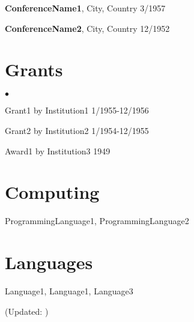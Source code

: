 \documentclass[margin, centered]{res} %
\newenvironment{list2}{
  \begin{list}{$\bullet$}{%
      \setlength{\itemsep}{0in}
      \setlength{\parsep}{0in} \setlength{\parskip}{0in}
      \setlength{\topsep}{0in} \setlength{\partopsep}{0in} 
      \setlength{\leftmargin}{0.2in}}}{\end{list}}
\begin{document}
\begin{resume}
{\bf ConferenceName1}, City, Country \hfill {3/1957}

{\bf ConferenceName2}, City, Country \hfill {12/1952}

\section{\sc Grants} 
\begin{list2}
\item Grant1 by Institution1 \hfill 1/1955-12/1956
\item  Grant2 by Institution2 \hfill 1/1954-12/1955
\item  Award1 by Institution3 \hfill 1949
\end{list2}


\section{\sc Computing} 
ProgrammingLanguage1, ProgrammingLanguage2


\section{\sc Languages} 
Language1, Language1, Language3

\end{resume}

\vspace{0.05cm}
\hfill   {\footnotesize (Updated: \monthname} {\footnotesize \the\year)}
\end{document}
